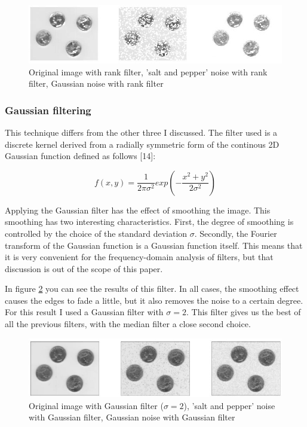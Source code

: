 \documentclass[12pt]{article}
\begin{document}
\begin{figure}[h]
\hspace*{-1.2cm}
\centering
\includegraphics[scale = 0.8]{img/noise_rank}
\caption{Original image with rank filter, 'salt and pepper' noise with rank filter, Gaussian noise with rank filter}
\label{noise_rank}
\end{figure}

\subsubsection{Gaussian filtering}

This technique differs from the other three I discussed. The filter used is a discrete kernel derived from a radially symmetric form of the continous 2D Gaussian function defined as follows [14]:

\begin{equation}
f(x,y) = \frac{1}{2\pi \sigma ^2} exp(-\frac{x^2 + y^2}{2\sigma^2})
\end{equation}
\newline

Applying the Gaussian filter has the effect of smoothing the image. This smoothing has two interesting characteristics. First, the degree of smoothing is controlled by the choice of the standard deviation $\sigma$. Secondly, the Fourier transform of the Gaussian function is a Gaussian function itself. This means that it is very convenient for the frequency-domain analysis of filters, but that discussion is out of the scope of this paper.
\newline

In figure \ref{noise_gaussian} you can see the results of this filter. In all cases, the smoothing effect causes the edges to fade a little, but it also removes the noise to a certain degree. For this result I used a Gaussian filter with $\sigma = 2$. This filter gives us the best of all the previous filters, with the median filter a close second choice.

\begin{figure}[h]
\hspace*{-1.2cm}
\centering
\includegraphics[scale = 0.6]{img/noise_gaussian}
\caption{Original image with Gaussian filter ($\sigma = 2$), 'salt and pepper' noise with Gaussian filter, Gaussian noise with Gaussian filter}
\label{noise_gaussian}
\end{figure}
\newpage
\end{document}
